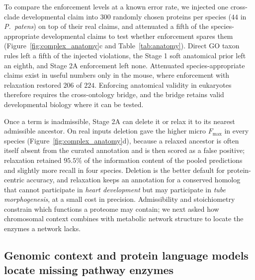 \documentclass[10pt,twocolumn]{article}
\begin{document}
To compare the enforcement levels at a known error rate, we injected one cross-clade developmental claim into $300$ randomly chosen proteins per species ($44$ in \textit{P.~patens}) on top of their real claims, and attenuated a fifth of the species-appropriate developmental claims to test whether enforcement spares them (Figure~\ref{fig:complex_anatomy}c and Table~\ref{tab:anatomy}). Direct GO taxon rules left a fifth of the injected violations, the Stage 1 soft anatomical prior left an eighth, and Stage 2A enforcement left none. Attenuated species-appropriate claims exist in useful numbers only in the mouse, where enforcement with relaxation restored $206$ of $224$. Enforcing anatomical validity in eukaryotes therefore requires the cross-ontology bridge, and the bridge retains valid developmental biology where it can be tested.

Once a term is inadmissible, Stage 2A can delete it or relax it to its nearest admissible ancestor. On real inputs deletion gave the higher micro $F_{\max}$ in every species (Figure~\ref{fig:complex_anatomy}d), because a relaxed ancestor is often itself absent from the curated annotation and is then scored as a false positive; relaxation retained $95.5\%$ of the information content of the pooled predictions and slightly more recall in four species. Deletion is the better default for protein-centric accuracy, and relaxation keeps an annotation for a conserved homolog that cannot participate in \textit{heart development} but may participate in \textit{tube morphogenesis}, at a small cost in precision. Admissibility and stoichiometry constrain which functions a proteome may contain; we next asked how chromosomal context combines with metabolic network structure to locate the enzymes a network lacks.

\subsection{Genomic context and protein language models locate missing pathway enzymes}
\end{document}

